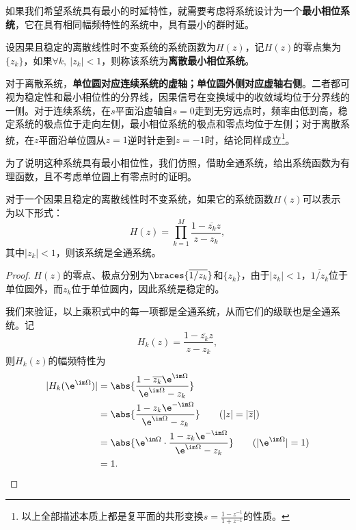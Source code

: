 如果我们希望系统具有最小的时延特性，就需要考虑将系统设计为一个\textbf{最小相位系统}，它在具有相同幅频特性的系统中，具有最小的群时延。
\begin{definition}[离散最小相位系统]
    设因果且稳定的离散线性时不变系统的系统函数为$H(z)$，记$H(z)$的零点集为$\{z_k\}$，如果$\forall k,\ |z_k|<1$，则称该系统为\textbf{离散最小相位系统}。
\end{definition}

对于离散系统，\textbf{单位圆对应连续系统的虚轴；单位圆外侧对应虚轴右侧}。二者都可视为稳定性和最小相位性的分界线，因果信号在变换域中的收敛域均位于分界线的一侧。对于连续系统，在$s$平面沿虚轴自$s=0$走到无穷远点时，频率由低到高，稳定系统的极点位于走向左侧，最小相位系统的极点和零点均位于左侧；对于离散系统，在$z$平面沿单位圆从$z=1$逆时针走到$z=-1$时，结论同样成立\footnote{以上全部描述本质上都是复平面的共形变换$s=\frac{1-z^{-1}}{1+z^{-1}}$的性质。}。

为了说明这种系统具有最小相位性，我们仿照，借助全通系统，给出系统函数为有理函数，且不考虑单位圆上有零点时的证明。

\begin{lemma}[离散全通系统]
    对于一个因果且稳定的离散线性时不变系统，如果它的系统函数$H(z)$可以表示为以下形式：
    \begin{equation}
        H(z)=\prod_{k=1}^{M}\frac{1-\overline{z_k}z}{z-z_k},
    \end{equation}
    其中$|z_k|<1$，则该系统是全通系统。
\end{lemma}
\begin{proof}
    $H(z)$的零点、极点分别为$\braces{\overline{1/z_k}}$和$\{z_k\}$，由于$|z_k|<1$，$\overline{1/z_k}$位于单位圆外，而$z_k$位于单位圆内，因此系统是稳定的。

    我们来验证，以上乘积式中的每一项都是全通系统，从而它们的级联也是全通系统。记
    \begin{equation}
        H_k(z)=\frac{1-\overline{z_k}z}{z-z_k},
    \end{equation}
    则$H_k(z)$的幅频特性为
    \begin{align}
        |H_k(\e^{\im\Omega})|&=\abs{\frac{1-\overline{z_k}\e^{\im\Omega}}{\e^{\im\Omega}-z_k}} \nonumber \\
        &=\abs{\frac{1-z_k \e^{-\im\Omega}}{\e^{\im\Omega}-z_k}} \qquad (|z|=|\overline{z}|) \nonumber \\
        &=\abs{\e^{\im\Omega}\cdot\frac{1-z_k \e^{-\im\Omega}}{\e^{\im\Omega}-z_k}} \qquad (|\e^{\im\Omega}|=1) \nonumber \\
        &=1.
    \end{align}
\end{proof}

